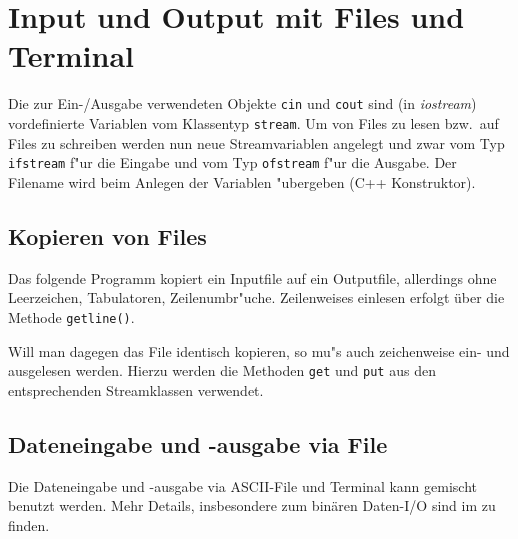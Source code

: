 \chapter{Input und Output mit Files und Terminal}
\label{p:8}
%
%
Die zur Ein-/Ausgabe verwendeten Objekte \verb|cin| und \verb|cout|
sind (in \textit{iostream}) vordefinierte Variablen vom Klassentyp
\verb|stream|. Um von Files zu lesen bzw.\   auf Files zu schreiben
werden nun neue Streamvariablen angelegt und zwar vom
Typ \verb|ifstream| f"ur die Eingabe und vom Typ \verb|ofstream|
f"ur die Ausgabe. Der Filename wird beim Anlegen der Variablen "ubergeben
(C++ Konstruktor).
%
%
\section{Kopieren von Files}
\label{p:8.1}
%
%
Das folgende Programm kopiert ein Inputfile auf ein Outputfile,
allerdings ohne Leerzeichen, Tabulatoren, Zeilenumbr"uche.
Zeilenweises einlesen erfolgt über die Methode \texttt{getline()}.
%

Will man dagegen das File identisch kopieren, so mu"s auch
zeichenweise ein- und ausgelesen werden.
Hierzu werden die Methoden \verb|get| und \verb|put| aus
den entsprechenden Streamklassen verwendet.
%
%

\section{Dateneingabe und -ausgabe via File}
\label{p:8.2}
%
%
Die Dateneingabe und -ausgabe via ASCII-File und Terminal kann gemischt
benutzt werden.
%
%
Mehr Details, insbesondere zum binären Daten-I/O sind im  zu finden.
%
